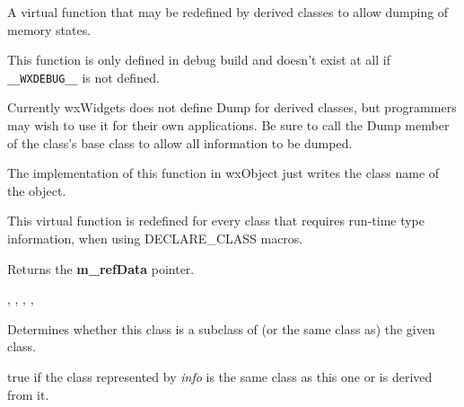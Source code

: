 
A virtual function that may be redefined by derived classes to allow dumping of
memory states.

This function is only defined in debug build and doesn't exist at all if
{\tt \_\_WXDEBUG\_\_} is not defined.




Currently wxWidgets does not define Dump for derived classes, but
programmers may wish to use it for their own applications. Be sure to
call the Dump member of the class's base class to allow all information to be
dumped.

The implementation of this function in wxObject just writes the class name of
the object.

\label{wxobjectgetclassinfo}


This virtual function is redefined for every class that requires run-time
type information, when using DECLARE\_CLASS macros.

\label{wxobjectgetrefdata}


Returns the {\bf m\_refData} pointer.


, , ,\rtfsp
{},\rtfsp
{}

\label{wxobjectiskindof}


Determines whether this class is a subclass of (or the same class as)
the given class.




true if the class represented by {\it info} is the same class as
this one or is derived from it.

